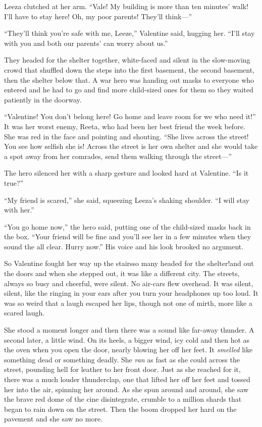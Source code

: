 Leeza clutched at her arm. “Vale! My building is more than ten
minutes’ walk! I’ll have to stay here! Oh, my poor parents! They’ll
think---”

“They’ll think you’re safe with me, Leeze,” Valentine said, hugging
her. “I’ll stay with you and both our parents’ can worry about
us.”

They headed for the shelter together, white-faced and silent in the
slow-moving crowd that shuffled down the steps into the first
basement, the second basement, then the shelter below that. A war
hero was handing out masks to everyone who entered and he had to go
and find more child-sized ones for them so they waited patiently in
the doorway.

“Valentine! You don’t belong here! Go home and leave room for we
who need it!” It was her worst enemy, Reeta, who had been her best
friend the week before. She was red in the face and pointing and
shouting. “She lives across the street! You see how selfish she is!
Across the street is her own shelter and she would take a spot away
from her comrades, send them walking through the street---”

The hero silenced her with a sharp gesture and looked hard at
Valentine. “Is it true?”

“My friend is scared,” she said, squeezing Leeza’s shaking
shoulder. “I will stay with her.”

“You go home now,” the hero said, putting one of the child-sized
masks back in the box. “Your friend will be fine and you’ll see her
in a few minutes when they sound the all clear. Hurry now.” His
voice and his look brooked no argument.

So Valentine fought her way up the stairs\dash{}so many headed for the
shelter!\dash{}and out the doors and when she stepped out, it was like a
different city. The streets, always so busy and cheerful, were
silent. No air-cars flew overhead. It was silent, silent, like the
ringing in your ears after you turn your headphones up too loud. It
was so weird that a laugh escaped her lips, though not one of
mirth, more like a scared laugh.

She stood a moment longer and then there was a sound like far-away
thunder. A second later, a little wind. On its heels, a bigger
wind, icy cold and then hot as the oven when you open the door,
nearly blowing her off her feet. It \emph{smelled} like something
dead or something deadly. She \emph{ran} as fast as she could
across the street, pounding hell for leather to her front door.
Just as she reached for it, there was a much louder thunderclap,
one that lifted her off her feet and tossed her into the air,
spinning her around. As she spun around and around, she saw the
brave red dome of the cine disintegrate, crumble to a million
shards that began to rain down on the street. Then the boom dropped
her hard on the pavement and she saw no more.

